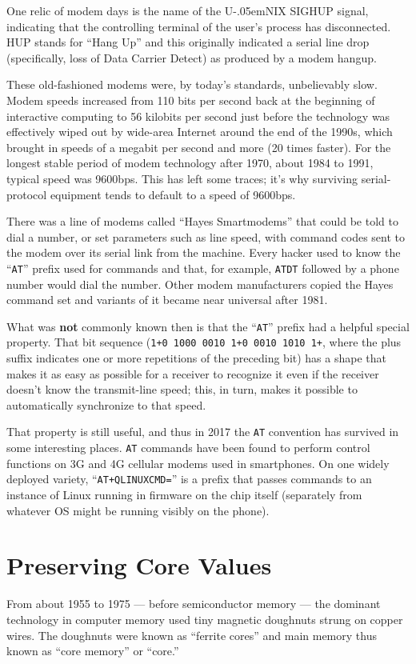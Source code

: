 \documentclass[12pt,letterpaper]{article}
\newcommand{\hexnum}[1]{\texttt{#1}}
\newcommand{\mc}{\small}
\newcommand{\acro}[1]{{\mc #1\spacefactor1000}}
\def\UNIX/{{\mc U\kern-.05emNIX\spacefactor1000}}%
\begin{document}
One relic of modem days is the name of the \UNIX/ \acro{SIGHUP} signal, indicating that
the controlling terminal of the user's process has disconnected. \acro{HUP} stands for
``Hang Up'' and this originally indicated a serial line drop (specifically, loss
of Data Carrier Detect) as produced by a modem hangup.

These old-fashioned modems were, by today's standards, unbelievably slow. Modem
speeds increased from 110 bits per second back at the beginning of interactive
computing to 56 kilobits per second just before the technology was effectively
wiped out by wide-area Internet around the end of the 1990s, which brought in
speeds of a megabit per second and more (20 times faster). For the longest
stable period of modem technology after 1970, about 1984 to 1991, typical speed
was 9600bps. This has left some traces; it's why surviving serial-protocol
equipment tends to default to a speed of 9600bps.

There was a line of modems called ``Hayes Smartmodems'' that could be told to
dial a number, or set parameters such as line speed, with command codes sent to
the modem over its serial link from the machine. Every hacker used to know the
``\texttt{AT}'' prefix used for commands and that, for example, \texttt{ATDT} followed by a phone
number would dial the number. Other modem manufacturers copied the Hayes
command set and variants of it became near universal after 1981.

What was \textbf{not} commonly known then is that the ``{\tt AT}'' prefix had a helpful special
property. That bit sequence (\hexnum{1+0 1000 0010 1+0 0010 1010 1+}, where the plus
suffix indicates one or more repetitions of the preceding bit) has a shape that
makes it as easy as possible for a receiver to recognize it even if the
receiver doesn't know the transmit-line speed; this, in turn, makes it possible
to automatically synchronize to that speed.

That property is still useful, and thus in 2017 the \texttt{AT} convention has survived
in some interesting places. \texttt{AT} commands have been found to perform control
functions on 3G and 4G cellular modems used in smartphones. On one widely
deployed variety, ``\texttt{AT+QLINUXCMD=}'' is a prefix that passes commands to an
instance of Linux running in firmware on the chip itself (separately from
whatever \acro{OS} might be running visibly on the phone).

\section{Preserving Core Values}
From about 1955 to 1975 --- before semiconductor memory --- the dominant technology
in computer memory used tiny magnetic doughnuts strung on copper wires. The
doughnuts were known as ``ferrite cores'' and main memory thus known as ``core
memory'' or ``core.''
\end{document}
